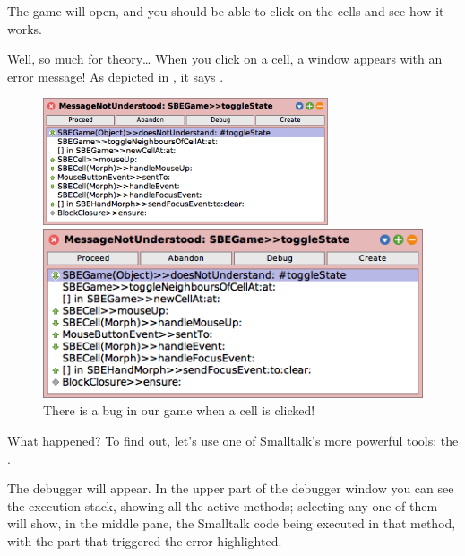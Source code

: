 \documentclass[a4paper,10pt,twoside]{book}
\begin{document}

The game will open, and you should be able to click on the cells and see how it works.

Well, so much for theory\ldots{}
When you click on a cell, a  window appears with an error message!
As depicted in , it says .

\begin{figure}[ht]
\ifluluelse
	{\centerline{\includegraphics[width=0.75\textwidth]{Error}}}
	{\centerline{\includegraphics[scale=0.7]{Error}}}
\caption{There is a bug in our game when a cell is clicked!
\label{fig:quintoError}}
\end{figure}

\noindent
What happened? To find out, let's use one of Smalltalk's more powerful tools: the .

The debugger will appear.
In the upper part of the debugger window you can see the execution stack, showing all the active methods; selecting any one of them will show, in the middle pane, the Smalltalk code being executed in that method, with the part that triggered the error highlighted.
\end{document}
